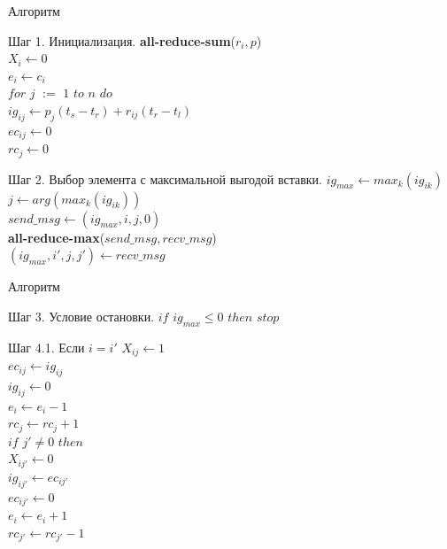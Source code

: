 \documentclass{beamer}
\begin{document}
\begin{frame}[fragile]{Алгоритм}
	\begin{block}{Шаг 1. Инициализация.}
		\textbf{all-reduce-sum}($r_i, p$)\\
		$X_i \gets 0$\\
		$e_i \gets c_i$\\
		$for$ $j$ $:=$ $1$ $to$ $n$ $do$\\
		\qquad$ig_{ij} \gets p_j (t_s - t_r) + r_{ij} (t_r - t_l)$\\
		\qquad$ec_{ij} \gets 0$\\
		\qquad$rc_j \gets 0$
	\end{block}

	\begin{block}{Шаг 2. Выбор элемента с максимальной выгодой вставки.}
		$ig_{max} \gets max_k (ig_{ik})$\\
		$j \gets arg(max_k(ig_{ik}))$\\
		$send\_msg \gets (ig_{max}, i, j, 0)$\\ 
		\textbf{all-reduce-max}($send\_msg, recv\_msg$)\\
		$(ig_{max}, i', j, j') \gets recv\_msg$		
	\end{block} 
\end{frame}

\begin{frame}[fragile]{Алгоритм}
	\begin{block}{Шаг 3. Условие остановки.}
		$if$ $ig_{max} \le 0$ $then$ $stop$
	\end{block}

	\begin{block}{Шаг 4.1. Если $i = i'$}
		$X_{ij} \gets 1$\\
		$ec_{ij} \gets ig_{ij}$\\
		$ig_{ij} \gets 0$\\
		$e_i \gets e_i - 1$\\
		$rc_j \gets rc_j + 1$\\
		$if$ $j' \neq 0$ $then$\\
		\qquad$X_{ij'} \gets 0$\\
		\qquad$ig_{ij'} \gets ec_{ij'}$\\
		\qquad$ec_{ij'} \gets 0$\\
		\qquad$e_i \gets e_i + 1$\\
		\qquad$rc_{j'} \gets rc_{j'} - 1$
	\end{block}
\end{frame}
\end{document}
